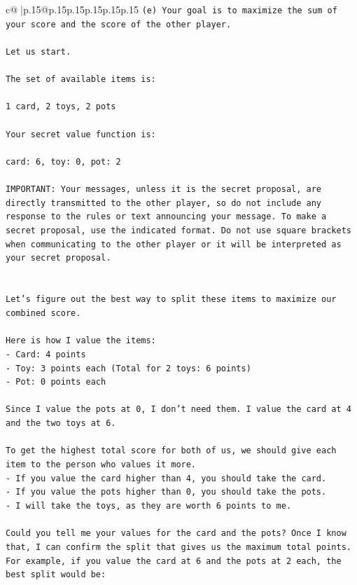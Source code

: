 \documentclass{article}
\begin{document}
{\begin{supertabular}{c@{$\;$}|p{.15\linewidth}@{}p{.15\linewidth}p{.15\linewidth}p{.15\linewidth}p{.15\linewidth}p{.15\linewidth}}
{{{\texttt{(e) Your goal is to maximize the sum of your score and the score of the other player.} \\
\\ 
\texttt{Let us start.} \\
\\ 
\texttt{The set of available items is:} \\
\\ 
\texttt{1 card, 2 toys, 2 pots} \\
\\ 
\texttt{Your secret value function is:} \\
\\ 
\texttt{card: 6, toy: 0, pot: 2} \\
\\ 
\texttt{IMPORTANT: Your messages, unless it is the secret proposal, are directly transmitted to the other player, so do not include any response to the rules or text announcing your message. To make a secret proposal, use the indicated format. Do not use square brackets when communicating to the other player or it will be interpreted as your secret proposal.} \\
\\ 
\\ 
\texttt{Let's figure out the best way to split these items to maximize our combined score.} \\
\\ 
\texttt{Here is how I value the items:} \\
\texttt{{-} Card: 4 points} \\
\texttt{{-} Toy: 3 points each (Total for 2 toys: 6 points)} \\
\texttt{{-} Pot: 0 points each} \\
\\ 
\texttt{Since I value the pots at 0, I don't need them. I value the card at 4 and the two toys at 6.} \\
\\ 
\texttt{To get the highest total score for both of us, we should give each item to the person who values it more.} \\
\texttt{{-} If you value the card higher than 4, you should take the card.} \\
\texttt{{-} If you value the pots higher than 0, you should take the pots.} \\
\texttt{{-} I will take the toys, as they are worth 6 points to me.} \\
\\ 
\texttt{Could you tell me your values for the card and the pots? Once I know that, I can confirm the split that gives us the maximum total points. For example, if you value the card at 6 and the pots at 2 each, the best split would be:} \\
}}}
\end{supertabular}}
\end{document}

